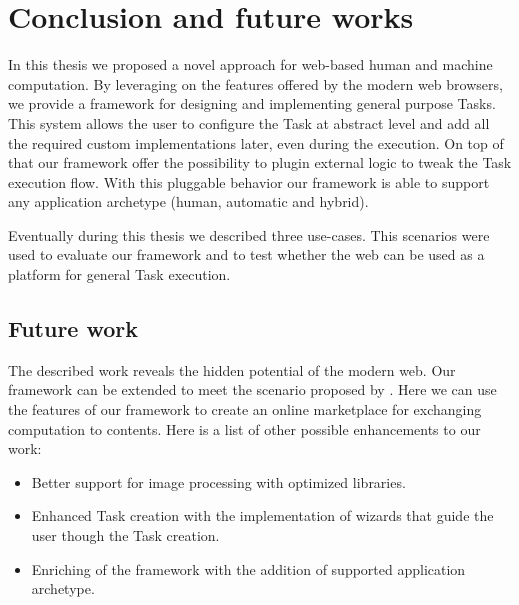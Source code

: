 \chapter{Conclusion and future works}
\label{cap:conclusion}

In this thesis we proposed a novel approach for web-based human and machine
computation. By leveraging on the features offered by the modern web browsers,
we provide a framework for designing and implementing general purpose Tasks.
This system allows the user to configure the Task at abstract level and add
all the required custom implementations later, even during the execution.
On top of that our framework offer the possibility to plugin external
logic to tweak the Task execution flow. With this pluggable behavior our framework
is able to support any application archetype (human, automatic and hybrid).

Eventually during this thesis we described three use-cases. This scenarios were
used to evaluate our framework and to test whether the web can be used as a
platform for general Task execution.

\section{Future work}
The described work reveals the hidden potential of the modern web. Our framework
can be extended to meet the scenario proposed by \cite{karame2011pay}. Here we
can use the features of our framework to create an online marketplace for exchanging
computation to contents. Here is a list of other possible enhancements to our work:
\begin{itemize}
    \item Better support for image processing with optimized libraries.
    \item Enhanced Task creation with the implementation of wizards that guide
    the user though the Task creation.
    \item Enriching of the framework with the addition of supported application
    archetype.
\end{itemize}